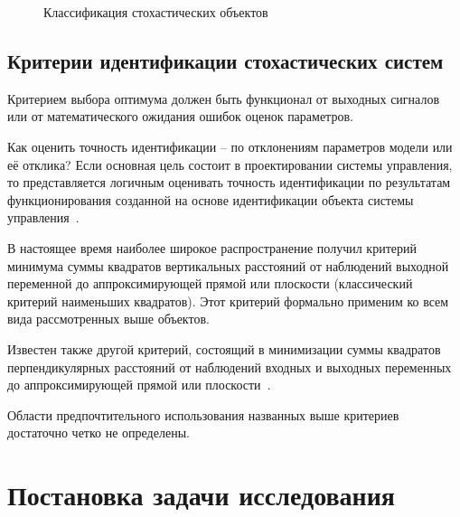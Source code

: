\begin{figure}[p]
  \vspace{\baselineskip}
  \caption{Классификация стохастических объектов}
\end{figure}


\newpage
\subsection{Критерии идентификации стохастических систем}

Критерием выбора оптимума должен быть функционал от выходных
сигналов или от математического ожидания ошибок оценок параметров.

Как оценить точность идентификации -- по отклонениям параметров
модели или её отклика? Если основная цель состоит в
проектировании системы управления, то представляется логичным
оценивать точность идентификации по результатам функционирования
созданной на основе идентификации объекта системы управления~\cite{eikhoff_1975}.

В настоящее время наиболее широкое распространение получил критерий
минимума суммы квадратов вертикальных расстояний от наблюдений выходной переменной
до аппроксимирующей прямой или плоскости (классический критерий наименьших квадратов).
Этот критерий формально применим ко всем вида рассмотренных выше объектов.

Известен также другой критерий, состоящий в минимизации суммы квадратов
перпендикулярных расстояний от наблюдений входных и выходных переменных до
аппроксимирующей прямой или плоскости~\cite{pearson_1901, mukha_2016}.

Области предпочтительного использования названных выше критериев
достаточно четко не определены.

\section{Постановка задачи исследования}

